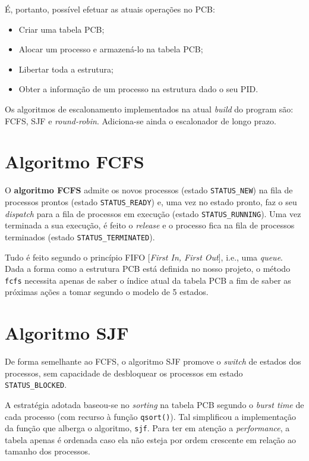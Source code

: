 \documentclass[10pt,oneside]{estiloUBI}
\begin{document}
	É, portanto, possível efetuar as atuais operações no \ac{PCB}:
	\begin{itemize}
	    \item Criar uma tabela \ac{PCB};
	    \item Alocar um processo e armazená-lo na tabela \ac{PCB};
	    \item Libertar toda a estrutura;
	    \item Obter a informação de um processo na estrutura dado o seu \ac{PID}.
	\end{itemize}
	
	Os algoritmos de escalonamento implementados na atual \textit{build} do program são: \ac{FCFS}, \ac{SJF} e \textit{round-robin}. Adiciona-se ainda o escalonador de longo prazo.
	
	
	\section{Algoritmo \ac{FCFS}}
	\label{ssec:process:fcfs}
	
	O \textbf{algoritmo \ac{FCFS}} admite os novos processos (estado \texttt{STATUS\_NEW}) na fila de processos prontos (estado \texttt{STATUS\_READY}) e, uma vez no estado pronto, faz o seu \textit{dispatch} para a fila de processos em execução (estado \texttt{STATUS\_RUNNING}). Uma vez terminada a sua execução, é feito o \textit{release} e o processo fica na fila de processos terminados (estado \texttt{STATUS\_TERMINATED}).
	
	Tudo é feito segundo o princípio FIFO [\textit{First In, First Out}], i.e., uma \textit{queue}. Dada a forma como a estrutura \ac{PCB} está definida no nosso projeto, o método \verb|fcfs| necessita apenas de saber o índice atual da tabela \ac{PCB} a fim de saber as próximas ações a tomar segundo o modelo de 5 estados.
	
	
	\section{Algoritmo \ac{SJF}}
	\label{ssec::process:sjf}
	
	De forma semelhante ao \ac{FCFS}, o algoritmo \ac{SJF} promove o \textit{switch} de estados dos processos, sem capacidade de desbloquear os processos em estado \verb|STATUS_BLOCKED|.
	
	A estratégia adotada baseou-se no \textit{sorting} na tabela \ac{PCB} segundo o \textit{burst time} de cada processo (com recurso à função \verb|qsort()|). Tal simplificou a implementação da função que alberga o algoritmo, \verb|sjf|. Para ter em atenção a \textit{performance}, a tabela apenas é ordenada caso ela não esteja por ordem crescente em relação ao tamanho dos processos.
	
\end{document}

